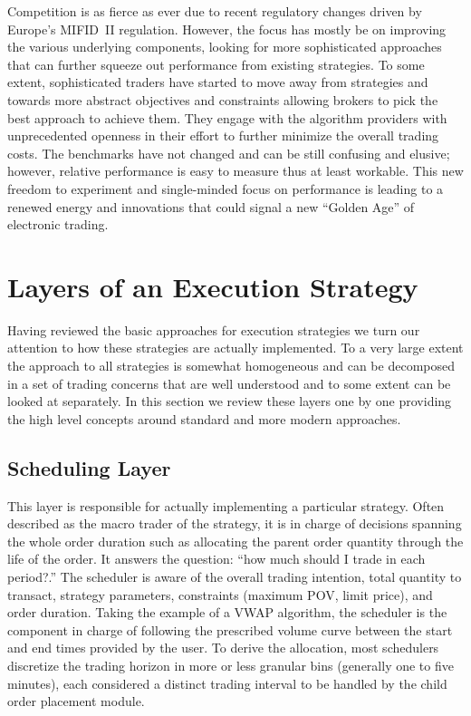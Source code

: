Competition is as fierce as ever due to recent regulatory changes driven by Europe's MIFID~II regulation. However, the focus has mostly be on improving the various underlying components, looking for more sophisticated approaches that can further squeeze out performance from existing strategies. To some extent, sophisticated traders have started to move away from strategies and towards more abstract objectives and constraints allowing brokers to pick the best approach to achieve them. They engage with the algorithm providers with unprecedented openness in their effort to further minimize the overall trading costs. The benchmarks have not changed and can be still confusing and elusive; however, relative performance is easy to measure thus at least workable. This new freedom to experiment and single-minded focus on performance is leading to a renewed energy and innovations that could signal a new ``Golden Age'' of electronic trading.



\section{Layers of an Execution Strategy}

Having reviewed the basic approaches for execution strategies we turn our attention to how these strategies are actually implemented. To a very large extent the approach to all strategies is somewhat homogeneous and can be decomposed in a set of trading concerns that are well understood and to some extent can be looked at separately. In this section we review these layers one by one providing the high level concepts around standard and more modern approaches.

\subsection{Scheduling Layer}

This layer is responsible for actually implementing a particular strategy. Often described as the macro trader of the strategy, it is in charge of decisions spanning the whole order duration such as allocating the parent order quantity through the life of the order. It answers the question: ``how much should I trade in each period?.'' The scheduler is aware of the overall trading intention, total quantity to transact, strategy parameters, constraints (maximum POV, limit price), and order duration. Taking the example of a VWAP algorithm, the scheduler is the component in charge of following the prescribed volume curve between the start and end times provided by the user. To derive the allocation, most schedulers discretize the trading horizon in more or less granular bins (generally one to five minutes), each considered a distinct trading interval to be handled by the child order placement module.


